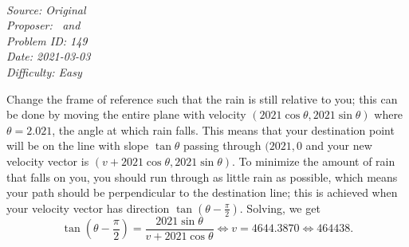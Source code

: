 \SSbreak\\
\emph{Source: Original}\\
\emph{Proposer: \Ptan\, and \Pwen}\\
\emph{Problem ID: 149}\\
\emph{Date: 2021-03-03}\\
\emph{Difficulty: Easy}\\
\SSbreak

\bigskip

\begin{solution}\hfil\medskip
  
    Change the frame of reference such that the rain is still relative to you; this can be done by moving the entire plane with velocity $(2021 \cos \theta, 2021 \sin \theta)$
    where $\theta = 2.021$, the angle at which rain falls. This means that your destination point will be on the line with slope $\tan \theta$ passing through $(2021, 0$
    and your new velocity vector is $(v + 2021 \cos \theta, 2021 \sin \theta)$. To minimize the amount of rain that falls on you, you should run through as little rain
    as possible, which means your path should be perpendicular to the destination line; this is achieved when your velocity vector has direction $\tan \left(\theta - \frac{\pi}{2}\right).$
    Solving, we get $$\tan \left(\theta - \dfrac{\pi}{2}\right) = \dfrac{2021 \sin \theta}{v + 2021 \cos \theta} \iff v = 4644.3870 \iff \boxed{464438}.$$
\end{solution}\bigskip
